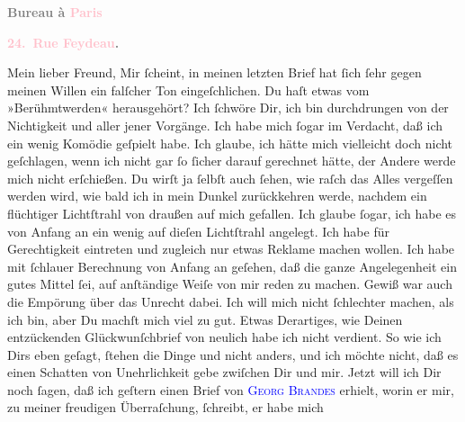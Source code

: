            \pstart
           \begin{otherlanguage}{french}\textcolor{gray}{\textbf{\textbf{Bureau à \textcolor{pink}{Paris}{}\ledrightnote{\textcolor{pink}{Paris}}}}}\end{otherlanguage}\pend
           \pstart
           \begin{otherlanguage}{french}\textcolor{gray}{\textbf{\textbf{\textcolor{pink}{24. Rue Feydeau}{}\ledrightnote{\textcolor{pink}{rue Feydeau}}.}}}\end{otherlanguage}\pend
           \pstart\center{}Mein lieber Freund,\pend\pstart
           Mir ſcheint, in meinen letzten Brief hat ſich ſehr gegen meinen Willen ein falſcher
               Ton eingeſchlichen. Du haſt etwas vom »Berühmtwerden« herausgehört? Ich ſchwöre Dir,
               ich bin durchdrungen von der Nichtigkeit und \label{K_L02794-111v}\label{K_L02794-111h} aller jener Vorgänge. Ich habe mich ſogar im Verdacht,
               daß ich ein  wenig Komödie geſpielt habe. Ich \strikeout{\textcolor{gray}{×}} glaube, ich hätte mich vielleicht doch nicht geſchlagen, wenn ich nicht gar ſo
               ſicher darauf gerechnet hätte, der Andere werde mich nicht erſchießen. Du wirſt ja
               ſelbſt auch ſehen, wie raſch das Alles vergeſſen werden {\pb}wird, wie bald ich in mein Dunkel zurückkehren
               werde, nachdem ein flüchtiger Lichtſtrahl von draußen auf mich gefallen. Ich glaube
               ſogar, ich habe es von Anfang an ein wenig auf dieſen Lichtſtrahl angelegt. Ich habe
               für Gerechtigkeit eintreten und zugleich nur etwas  Reklame machen wollen. Ich habe mit ſchlauer Berechnung von Anfang an
               geſehen, daß die ganze Angelegenheit ein gutes Mittel ſei, auf anſtändige Weiſe von
               mir reden zu machen. Gewiß war auch die Empörung über das Unrecht dabei. Ich will
               mich nicht ſchlechter machen, als ich bin, aber Du machſt {\pb}mich viel zu gut. Etwas Derartiges, wie Deinen
               entzückenden Glückwunſchbrief von neulich habe ich nicht verdient. So wie ich Dirs
               eben geſagt, ſtehen die Dinge und nicht anders, und ich möchte nicht, daß es einen
               Schatten von Unehrlichkeit gebe zwiſchen Dir und mir.\pend
           \pstart
           Jetzt will ich Dir noch ſagen, daß ich geſtern einen
               Brief von \textsc{\textcolor{blue}{Georg Brandes}{}\ledrightnote{\textcolor{blue}{Georg Brandes}}} erhielt, worin er mir, zu meiner freudigen Überraſchung, ſchreibt, er habe mich
